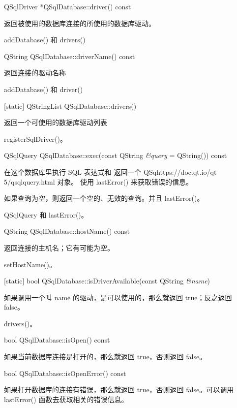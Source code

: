 QSqlDriver *QSqlDatabase::driver() const

返回被使用的数据库连接的所使用的数据库驱动。

\begin{seeAlso}
addDatabase() 和 drivers()
\end{seeAlso}

QString QSqlDatabase::driverName() const

返回连接的驱动名称

\begin{seeAlso}
addDatabase() 和 driver()
\end{seeAlso}

[static] QStringList QSqlDatabase::drivers()

返回一个可使用的数据库驱动列表 

\begin{seeAlso}
registerSqlDriver()。
\end{seeAlso}

QSqlQuery QSqlDatabase::exec(const QString \emph{\&query} = QString()) const


在这个数据库里执行 SQL 表达式和 返回一个 QSqhttps://doc.qt.io/qt-5/qsqlquery.html 对象。
使用 lastError() 来获取错误的信息。

如果查询为空，则返回一个空的、无效的查询。并且 lastError()。

\begin{seeAlso}
QSqlQuery 和 lastError()。
\end{seeAlso}

QString QSqlDatabase::hostName() const


返回连接的主机名；它有可能为空。

\begin{seeAlso}
 setHostName()。
\end{seeAlso}


[static] bool QSqlDatabase::isDriverAvailable(const QString \emph{\&name})


如果调用一个叫 name 的驱动，是可以使用的，那么就返回 true；反之返回 false。

\begin{seeAlso}
drivers()。
\end{seeAlso}

bool QSqlDatabase::isOpen() const

如果当前数据库连接是打开的，那么就返回 true，否则返回 false。

bool QSqlDatabase::isOpenError() const


如果打开数据库的连接有错误，那么就返回 true，否则返回 false。可以调用 lastError() 函数去获取相关的错误信息。

